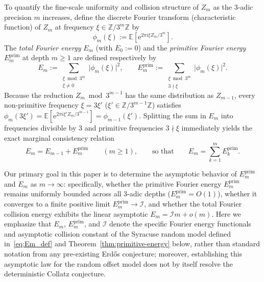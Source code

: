 \documentclass[11pt,a4paper]{article}
\numberwithin{equation}{section}
\theoremstyle{definition}
\theoremstyle{remark}
\newcommand{\Z}{\mathbb{Z}}
\newcommand{\E}{\mathbb{E}}
\newcommand{\cI}{\mathcal{I}}
\newcommand{\prim}{\mathrm{prim}}
\newcommand{\e}{\mathrm{e}}
\begin{document}
To quantify the fine-scale uniformity and collision structure of $Z_m$ as the $3$-adic precision $m$ increases, define the discrete Fourier transform (characteristic function) of $Z_m$ at frequency $\xi \in \Z/3^m\Z$ by
\begin{equation}\label{eq:phi_m_def}
\phi_m(\xi) := \E\!\left[\e^{2\pi i \xi Z_m / 3^m}\right].
\end{equation}
The \emph{total Fourier energy} $E_m$ (with $E_0 := 0$) and the \emph{primitive Fourier energy} $E_m^{\prim}$ at depth $m \ge 1$ are defined respectively by
\begin{equation}\label{eq:Em_def}
E_m := \sum_{\substack{\xi \bmod 3^m \\ \xi \neq 0}} \bigl|\phi_m(\xi)\bigr|^2, \qquad
E_m^{\prim} := \sum_{\substack{\xi \bmod 3^m \\ 3 \nmid \xi}} \bigl|\phi_m(\xi)\bigr|^2.
\end{equation}
Because the reduction $Z_m \bmod 3^{m-1}$ has the same distribution as $Z_{m-1}$, every non-primitive frequency $\xi = 3\xi'$ ($\xi' \in \Z/3^{m-1}\Z$) satisfies $\phi_m(3\xi') = \E[\e^{2\pi i \xi' Z_m / 3^{m-1}}] = \phi_{m-1}(\xi')$. Splitting the sum in $E_m$ into frequencies divisible by $3$ and primitive frequencies $3 \nmid \xi$ immediately yields the exact marginal consistency relation
\begin{equation}\label{eq:Em_recursion}
E_m = E_{m-1} + E_m^{\prim} \qquad (m \ge 1), \qquad\text{so that}\qquad E_m = \sum_{k=1}^m E_k^{\prim}.
\end{equation}

Our primary goal in this paper is to determine the asymptotic behavior of $E_m^{\prim}$ and $E_m$ as $m \to \infty$: specifically, whether the primitive Fourier energy $E_m^{\prim}$ remains uniformly bounded across all $3$-adic depths ($E_m^{\prim} = O(1)$), whether it converges to a finite positive limit $E_m^{\prim} \to \cI$, and whether the total Fourier collision energy exhibits the linear asymptotic $E_m = \cI m + o(m)$. Here we emphasize that $E_m$, $E_m^{\prim}$, and $\cI$ denote the specific Fourier energy functionals and asymptotic collision constant of the Syracuse random model defined in~\eqref{eq:Em_def} and Theorem~\ref{thm:primitive-energy} below, rather than standard notation from any pre-existing Erd\H{o}s conjecture; moreover, establishing this asymptotic law for the random offset model does not by itself resolve the deterministic Collatz conjecture.
\end{document}
